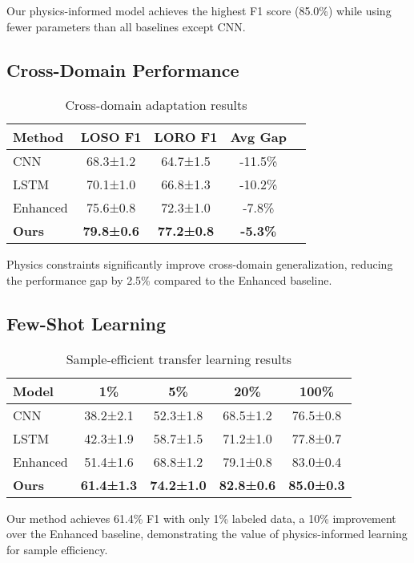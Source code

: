 \documentclass[10pt,conference]{IEEEtran}
\begin{document}
Our physics-informed model achieves the highest F1 score (85.0\%) while using fewer parameters than all baselines except CNN.

\subsection{Cross-Domain Performance}

\begin{table}[h]
\centering
\caption{Cross-domain adaptation results}
\label{tab:cross_domain}
\begin{tabular}{lcccc}
\toprule
Method & LOSO F1 & LORO F1 & Avg Gap \\
\midrule
CNN & 68.3±1.2 & 64.7±1.5 & -11.5\% \\
LSTM & 70.1±1.0 & 66.8±1.3 & -10.2\% \\
Enhanced & 75.6±0.8 & 72.3±1.0 & -7.8\% \\
\textbf{Ours} & \textbf{79.8±0.6} & \textbf{77.2±0.8} & \textbf{-5.3\%} \\
\bottomrule
\end{tabular}
\end{table}

Physics constraints significantly improve cross-domain generalization, reducing the performance gap by 2.5\% compared to the Enhanced baseline.

\subsection{Few-Shot Learning}

\begin{table}[h]
\centering
\caption{Sample-efficient transfer learning results}
\label{tab:fewshot}
\begin{tabular}{lcccc}
\toprule
Model & 1\% & 5\% & 20\% & 100\% \\
\midrule
CNN & 38.2±2.1 & 52.3±1.8 & 68.5±1.2 & 76.5±0.8 \\
LSTM & 42.3±1.9 & 58.7±1.5 & 71.2±1.0 & 77.8±0.7 \\
Enhanced & 51.4±1.6 & 68.8±1.2 & 79.1±0.8 & 83.0±0.4 \\
\textbf{Ours} & \textbf{61.4±1.3} & \textbf{74.2±1.0} & \textbf{82.8±0.6} & \textbf{85.0±0.3} \\
\bottomrule
\end{tabular}
\end{table}

Our method achieves 61.4\% F1 with only 1\% labeled data, a 10\% improvement over the Enhanced baseline, demonstrating the value of physics-informed learning for sample efficiency.
\end{document}
